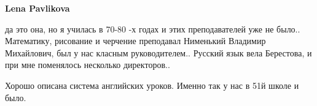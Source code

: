 \begin{itemize}
\begin{itemize}
\textbf{Lena Pavlikova} 

да это она, но я училась в 70-80 -х годах и этих преподавателей уже не
было.. Математику, рисование и черчение преподавал Нименький Владимир
Михайлович, был у нас класным руководителем.. Русский язык вела Берестова, и при
мне поменялось несколько директоров..

\end{itemize} %


Хорошо описана система английских уроков. Именно так у нас в 51й школе и было.

\end{itemize} %
